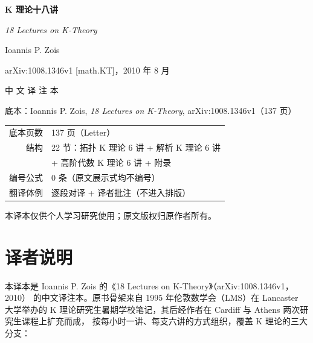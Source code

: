 \begin{titlepage}
\centering
\vspace*{2.8cm}

{\Huge\bfseries K 理论十八讲\par}
\vspace{0.45cm}
{\Large\itshape 18 Lectures on K-Theory\par}
\vspace{1.0cm}
{\Large Ioannis P. Zois\par}
\vspace{0.4cm}
{\large arXiv:1008.1346v1 [math.KT]，2010 年 8 月\par}

\vspace{1.9cm}
{\LARGE 中 文 译 注 本\par}
\vspace{0.6cm}
{\normalsize 底本：Ioannis P. Zois, \emph{18 Lectures on K-Theory},
  arXiv:1008.1346v1（137 页）\par}

\vfill
{\small
\begin{tabular}{rl}
底本页数 & 137 页（Letter）\\
结构 & 22 节：拓扑 K 理论 6 讲 + 解析 K 理论 6 讲 \\
     & + 高阶代数 K 理论 6 讲 + 附录 \\
编号公式 & 0 条（原文展示式均不编号）\\
翻译体例 & 逐段对译 + 译者批注（不进入排版）\\
\end{tabular}\par}
\vspace{1.3cm}
{\small 本译本仅供个人学习研究使用；原文版权归原作者所有。\par}
\end{titlepage}


\thispagestyle{empty}
\section*{译者说明}

本译本是 Ioannis P. Zois 的《18 Lectures on K-Theory》（arXiv:1008.1346v1，2010）
的中文译注本。原书骨架来自 1995 年伦敦数学会（LMS）在 Lancaster 大学举办的
K 理论研究生暑期学校笔记，其后经作者在 Cardiff 与 Athens 两次研究生课程上扩充而成，
按每小时一讲、每支六讲的方式组织，覆盖 K 理论的三大分支：

